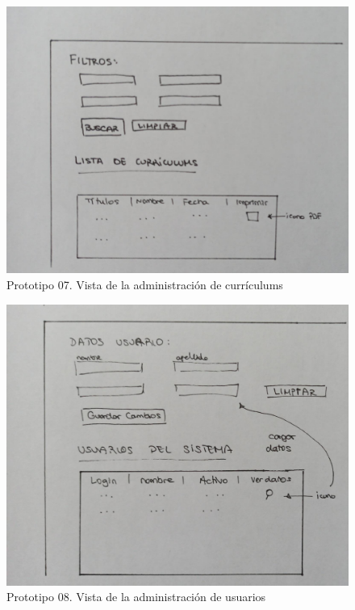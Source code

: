 \begin{figure}
    \centering
    \includegraphics[width=\linewidth]{img/PT07-CVAdmin.jpeg}
    \caption{Prototipo 07. Vista de la administración de currículums}    
\end{figure}

\begin{figure}
    \centering
    \includegraphics[width=\linewidth]{img/PT08-UserAdmin.jpeg}
    \caption{Prototipo 08. Vista de la administración de usuarios} 
\end{figure}



